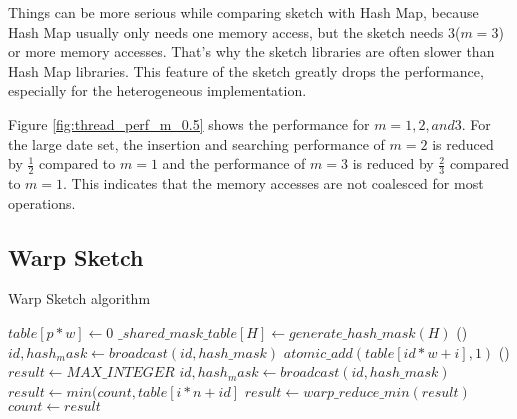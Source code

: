 \documentclass[conference]{IEEEtran}
\begin{document}
Things can be more serious while comparing sketch with Hash Map, because Hash Map usually only needs one memory access, but the sketch needs 3($m = 3$) or more memory accesses. That's why the sketch libraries are often slower than Hash Map libraries. This feature of the sketch greatly drops the performance, especially for the heterogeneous implementation.

Figure \ref{fig:thread_perf_m_0.5} shows the performance for $m = 1, 2, and 3$. For the large date set, the insertion and searching performance of $m = 2$ is reduced by $\frac{1}{2}$ compared to $m = 1$ and the performance of $m = 3$ is reduced by $\frac{2}{3}$ compared to $m = 1$. This indicates that the memory accesses are not coalesced for most operations.

\subsection{Warp Sketch}

\begin{algorithm}
    \DontPrintSemicolon
    \caption{Warp Sketch algorithm}
    $table[p * w] \longleftarrow 0$\;
    $\_shared\_ mask\_table[H] \longleftarrow generate\_hash\_mask(H)$\;
\Fn(){}
{
    {
            $id, hash_mask \leftarrow broadcast(id, hash\_mask)$\;
            {
                {
                    $atomic\_add(table[id * w + i], 1)$
                }
            }
    }
}
\Fn(){}
{
    {
        $result \leftarrow MAX\_INTEGER$\;
            $id, hash_mask \leftarrow broadcast(id, hash\_mask)$\;
            {
                {
                    $result \leftarrow min(count, table[i * n + id]$
                }
            }
        $result \leftarrow warp\_reduce\_min(result)$\;
        {
            $count \leftarrow result$
        }
    }
}

\end{algorithm}
\end{document}
